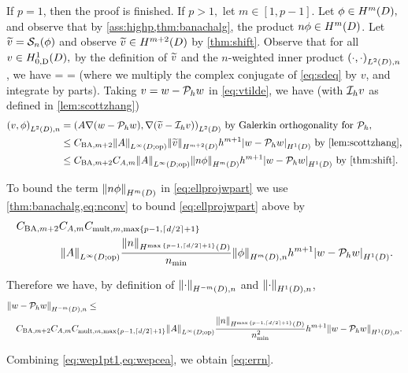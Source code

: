 If $p=1$, then the proof is finished. If $p > 1,$ let $m \in [1,p-1]$. Let $\phi \in \HmD,$ and observe that by \cref{ass:highp,thm:banachalg}, the product $n\phi\in \HmD$. Let $ \widetilde{v} = \mathcal S_{n}(\phi)$ and observe $\vtilde \in \Hfn{}{m+2}{D}$ by \cref{thm:shift}. Observe that for all $v \in \HozDD,$ by the definition of $\widetilde{v}$ and the $n$-weighted inner product $\IPLtDn{\cdot}{\cdot}$, we have 
\beq\label{eq:vtilde}
 =  = 
\eeq
(where we multiply the complex conjugate of \cref{eq:sdeq} by $v$, and integrate by parts).
Taking $v = w-\mathcal P_{h} w$ in \cref{eq:vtilde}, we have (with $\mathcal I_{h} v$ as defined in \cref{lem:scottzhang})
\begin{align}
\IPLtDn{v}{\phi} &= \IPLtD{A\grad\mleft(w-\Ph w\mright)}{\grad\mleft(\vtilde - \Ih v\mright)} \text{ by Galerkin orthogonality for } \Ph,\nonumber\\
&\leq \CSZfn{m+2}\NLiDop{A} \NHfn{m+2}{D}{\vtilde} h^{m+1} \SNHoD{w-\Ph w} \text{ by \cref{lem:scottzhang},}\nonumber\\
&\leq \CSZfn{m+2} \CAfn{m} \NLiDop{A} \NHfn{m}{D}{n\phi} h^{m+1}\SNHoD{w-\Ph w}\text{ by \cref{thm:shift}.}\label{eq:ellprojwpart}
\end{align}

To bound the term $\NHfn{m}{D}{n\phi}$ in \cref{eq:ellprojwpart} we use  \cref{thm:banachalg,eq:nconv} to bound \cref{eq:ellprojwpart} above by
\begin{align}
&  \CSZfn{m+2} \CAfn{m} \CBanfn{m}{\max\set{p-1,\ceil{d/2}+1}}\nonumber\\
  &\quad\quad\quad\quad\NLiDop{A} \frac{\SNtemp{n}}{\nmin}\NHnfn{m}{D}{\phi} h^{m+1}\SNHoD{w-\Ph w}.\label{eq:wep1pt0}
\end{align}

Therefore we have, by definition of $\NHnfn{-m}{D}{\cdot}$ and $\NHoDn{\cdot}$,
\begin{align}
&  \NHnfn{-m}{D}{w-\Ph w} \leq\nonumber\\
  &\quad\CSZfn{m+2}\CAfn{m} \CBanfn{m}{\max\set{p-1,\ceil{d/2}+1}} \NLiDop{A} \frac{\SNtemp{n}}{\nmin^2} h^{m+1} \NHoDn{w - \Ph w}.\label{eq:wep1pt1}
\end{align}

Combining \cref{eq:wep1pt1,eq:wepcea}, we obtain \cref{eq:errn}.

\epf

